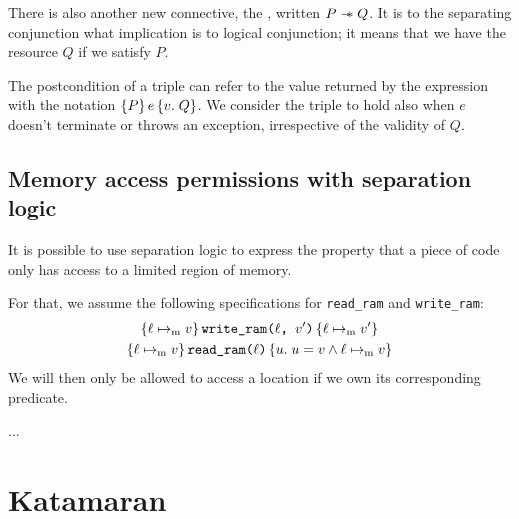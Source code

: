 There is also another new connective, the , written \(P \mathrel{-\!\!\ast} Q\). It is to the separating conjunction what implication is to logical conjunction; it means that we have the resource \(Q\) if we satisfy \(P\).

The postcondition of a triple can refer to the value returned by the expression with the notation \(\hoare{P}{e}[v]{Q}\). We consider the triple to hold also when \(e\) doesn't terminate or throws an exception, irrespective of the validity of \(Q\).

\subsection{Memory access permissions with separation logic}

It is possible to use separation logic to express the property that a piece of code only has access to a limited region of memory.

For that, we assume the following specifications for \texttt{read\_ram} and \texttt{write\_ram}:
\begin{gather*}
  \hoare{\ell \ptom v}{\texttt{write\_ram($\ell$, $v'$)}}{\ell \ptom v'} \\
  \hoare{\ell \ptom v}{\texttt{read\_ram($\ell$)}}[u]{u = v \wedge \ell \ptom v}
\end{gather*}
We will then only be allowed to access a location if we own its corresponding predicate.

 ...


\section{Katamaran}

